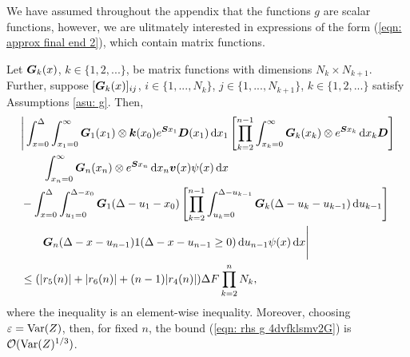 We have assumed throughout the appendix that the functions \(g\) are scalar functions, however, we are ulitmately interested in expressions of the form (\ref{eqn: approx final end 2}), which contain matrix functions. 
\begin{lem}\label{lem: boobies}
	Let \(\boldsymbol G_k(x)\), \(k\in\{1,2,...\}\), be matrix functions with dimensions \(N_k \times N_{k+1}\). Further, suppose \([\boldsymbol G_k(x)]_{ij}\), \(i\in\{1,...,N_{k}\}\), \(j\in\{1,...,N_{k+1}\}\), \(k\in\{1,2,...\}\) satisfy Assumptions \ref{asu: g}. Then, 
	\begin{align}
		&\Bigg| \int_{x=0}^\Delta \int_{x_1=0}^\infty \boldsymbol G_1(x_1) \otimes \boldsymbol k(x_0) e^{\boldsymbol{S}x_1} \boldsymbol D (x_1) \, \mathrm{d} x_1
		\left[\prod_{k=2}^{n-1}\int_{x_k=0}^\infty \boldsymbol G_{k }(x_k) \otimes e^{\boldsymbol{S}x_k} \, \mathrm{d} x_k \boldsymbol D\right] \nonumber
\\&\qquad{}\int_{x_n=0}^\infty \boldsymbol G_{n }(x_n)\otimes e^{\boldsymbol{S}x_n} \, \mathrm{d} x_n {\boldsymbol v}(x) \psi(x) \, \mathrm{d} x \nonumber 
		\\&{}- \int_{x=0}^\Delta \int_{u_1=0}^{\Delta-x_0}\boldsymbol G_1(\Delta - u_1 - x_0)
		\left[\prod_{k=2}^{n-1} \int_{u_k=0}^{\Delta-u_{k-1}} \boldsymbol G_{k}(\Delta-u_k-u_{k-1})\, \mathrm{d} u_{k-1}\right] \nonumber 
				\\&\qquad{} \boldsymbol G_{n }(\Delta - x-u_{n-1})
			1(\Delta-x-u_{n-1}\geq0) \, \mathrm{d} u_{n-1}\psi(x) \, \mathrm{d} x \Bigg| \nonumber
		\\&\leq (|r_5(n)| + |r_6(n)| + (n-1)|r_4(n)|)\Delta F \prod_{k=2}^{n}N_{k}, \label{eqn: rhs g 4dvfklsmv2G}
	\end{align}
	where the inequality is an element-wise inequality. Moreover, choosing \(\varepsilon=\mathrm{Var}(Z)\), then, for fixed \(n\), the bound (\ref{eqn: rhs g 4dvfklsmv2G}) is \(\mathcal O(\mathrm{Var}(Z)^{1/3})\). 
\end{lem}
